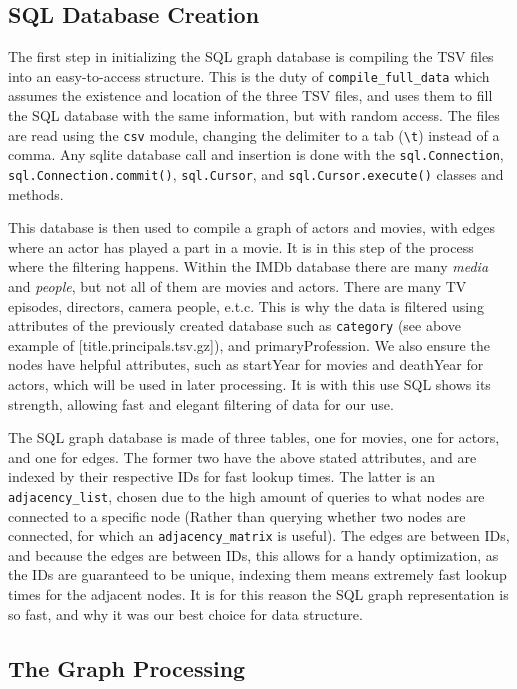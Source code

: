 \documentclass{article}
\begin{document}
\subsection{SQL Database Creation}

The first step in initializing the SQL graph database is compiling the TSV files into an easy-to-access structure. This is the duty of \verb!compile_full_data! which assumes the existence and location of the three TSV files, and uses them to fill the SQL database with the same information, but with random access. The files are read using the \verb!csv! module, changing the delimiter to a tab (\verb!\t!) instead of a comma. Any sqlite database call and insertion is done with the \verb!sql.Connection!, \verb!sql.Connection.commit()!, \verb!sql.Cursor!, and \verb!sql.Cursor.execute()! classes and methods.

This database is then used to compile a graph of actors and movies, with edges where an actor has played a part in a movie. It is in this step of the process where the filtering happens. Within the IMDb database there are many \emph{media} and \emph{people}, but not all of them are movies and actors. There are many TV episodes, directors, camera people, e.t.c. This is why the data is filtered using attributes of the previously created database such as \verb+category+ (see above example of [title.principals.tsv.gz]), and primaryProfession. We also ensure the nodes have helpful attributes, such as startYear for movies and deathYear for actors, which will be used in later processing. It is with this use SQL shows its strength, allowing fast and elegant filtering of data for our use.

The SQL graph database is made of three tables, one for movies, one for actors, and one for edges. The former two have the above stated attributes, and are indexed by their respective IDs for fast lookup times. The latter is an \verb+adjacency_list+, chosen due to the high amount of queries to what nodes are connected to a specific node (Rather than querying whether two nodes are connected, for which an \verb+adjacency_matrix+ is useful). The edges are between IDs, and because the edges are between IDs, this allows for a handy optimization, as the IDs are guaranteed to be unique, indexing them means extremely fast lookup times for the adjacent nodes. It is for this reason the SQL graph representation is so fast, and why it was our best choice for data structure.

\subsection{The Graph Processing}
\end{document}
